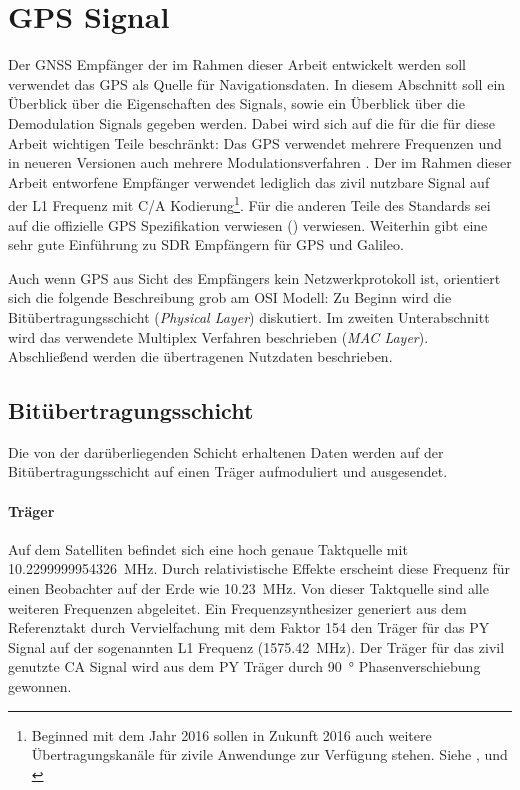 \section{GPS Signal}
Der GNSS Empfänger der im Rahmen dieser Arbeit entwickelt werden soll verwendet das \gls{GPS} als Quelle für Navigationsdaten. In diesem Abschnitt soll ein Überblick über die Eigenschaften des Signals, sowie ein Überblick über die Demodulation Signals gegeben werden. Dabei wird sich auf die für die für diese Arbeit wichtigen Teile beschränkt: Das GPS verwendet mehrere Frequenzen und in neueren Versionen auch mehrere Modulationsverfahren \cite{specification2010gps}. Der im Rahmen dieser Arbeit entworfene Empfänger verwendet lediglich das zivil nutzbare Signal auf der L1 Frequenz mit C/A Kodierung\footnote{Beginned mit dem Jahr 2016 sollen in Zukunft 2016 auch weitere Übertragungskanäle für zivile Anwendunge zur Verfügung stehen. Siehe \cite{interface1gps}, \cite{specification2010gps} und \cite{navstar2006space}}. Für die anderen Teile des Standards sei auf die offizielle GPS Spezifikation verwiesen (\cite{specification2010gps}) verwiesen. Weiterhin gibt \cite{borre2007software} eine sehr gute Einführung zu \gls{SDR} Empfängern für \gls{GPS} und Galileo. 

Auch wenn GPS aus Sicht des Empfängers kein Netzwerkprotokoll ist, orientiert sich die folgende Beschreibung grob am OSI Modell: Zu Beginn wird die Bitübertragungsschicht (\emph{Physical Layer}) diskutiert. Im zweiten Unterabschnitt wird das verwendete Multiplex Verfahren beschrieben (\emph{\gls{MAC} Layer}). Abschließend werden die übertragenen Nutzdaten beschrieben.

\subsection{Bitübertragungsschicht}
Die von der darüberliegenden Schicht erhaltenen Daten werden auf der Bitübertragungsschicht auf einen Träger aufmoduliert und ausgesendet. 

\paragraph{Träger} 
Auf dem Satelliten befindet sich eine hoch genaue Taktquelle mit \SI{10.2299999954326}{\MHz}. Durch relativistische Effekte erscheint diese Frequenz für einen Beobachter auf der Erde wie \SI{10.23}{\MHz}. Von dieser Taktquelle sind alle weiteren Frequenzen abgeleitet. Ein Frequenzsynthesizer generiert aus dem Referenztakt durch Vervielfachung mit dem Faktor 154 den Träger für das \gls{PY} Signal auf der sogenannten L1 Frequenz (\SI{1575.42}{\MHz}). Der Träger für das zivil genutzte \gls{CA} Signal wird aus dem \gls{PY} Träger durch \SI{90}{\degree} Phasenverschiebung gewonnen.

